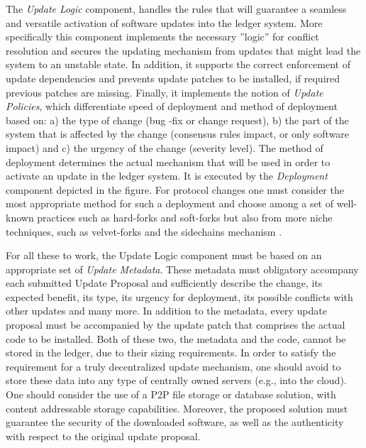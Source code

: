 The \emph{Update Logic} component, handles the rules that will guarantee a seamless and versatile activation of software updates into the ledger system. More specifically this component implements the necessary ''logic'' for conflict resolution and secures the updating mechanism from updates that might lead the system to an unstable state. In addition, it supports the correct enforcement of update dependencies and prevents update patches to be installed, if required previous patches are missing. Finally, it implements the notion of \emph{Update Policies}, which differentiate speed of deployment and method of deployment based on: a) the type of change (bug -fix or change request), b) the part of the system that is affected by the change (consensus rules impact, or only software impact) and c) the urgency of the change (severity level). The method of deployment determines the actual mechanism that will be used in order to activate an update in the ledger system. It is executed by the \emph{Deployment} component depicted in the figure. For protocol changes one must consider the most appropriate method for such a deployment and choose among a set of well-known practices such as hard-forks and soft-forks but also from more niche techniques, such as velvet-forks \cite{velvet} and the sidechains mechanism \cite{sidechains}.

For all these to work, the Update Logic component must be based on an appropriate set of \emph{Update Metadata}. These metadata must obligatory accompany each submitted Update Proposal and sufficiently describe the change, its expected benefit, its type, its urgency for deployment, its possible conflicts with other updates and many more. In addition to the metadata, every update proposal must be accompanied by the update patch that comprises the actual code to be installed. Both of these two, the metadata and the code, cannot be stored in the ledger, due to their sizing requirements. In order to satisfy the requirement for a truly decentralized update mechanism, one should avoid to store these data into any type of centrally owned servers (e.g., into the cloud). One should consider the use of a P2P file storage or database solution, with content addressable storage capabilities. Moreover, the proposed solution  must guarantee the security of the downloaded software, as well as the authenticity with respect to the original update proposal.
